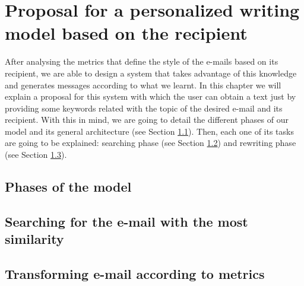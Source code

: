 \chapter{Proposal for a personalized writing model based on the recipient}\label{cap:proposal}


After analysing the metrics that define the style of the e-mails based on its recipient, we are able to design a system that takes advantage of this knowledge and generates messages according to what we learnt. In this chapter we will explain a proposal for this system with which the user can obtain a text just by providing some keywords related with the topic of the desired e-mail and its recipient. With this in mind, we are going to detail the different phases of our model and its general architecture (see Section \ref{sect:phasemod}). Then, each one of its tasks are going to be explained: searching phase (see Section \ref{sect:searchemail}) and rewriting phase (see Section \ref{sect:transemail}).

\section{Phases of the model}\label{sect:phasemod}


\section{Searching for the e-mail with the most similarity}\label{sect:searchemail}


\section{Transforming e-mail according to metrics}\label{sect:transemail}
